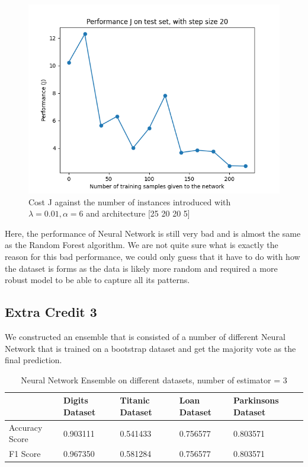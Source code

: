 \documentclass[letterpaper]{article}
\begin{document}
\begin{figure}[H]
	\includegraphics[width=\textwidth]{figures/nn_cleveland.csv_cost.png}
	\caption{Cost J against the number of instances introduced with $\lambda=0.01, \alpha=6$ and architecture [25 20 20 5]}
	\label{fig:nn-cleveland}
\end{figure}

Here, the performance of Neural Network is still very bad and is almost the same as the Random Forest algorithm. We are not quite sure what is exactly
the reason for this bad performance, we could only guess that it have to do with how the dataset is forms as the data is likely more random and required
a more robust model to be able to capture all its patterns.


\subsection*{Extra Credit 3}

We constructed an ensemble that is consisted of a number of different Neural Network that is trained on a bootstrap dataset and get the majority vote
as the final prediction.

\begin{table}[H]
	\centering
	\begin{tabular}{|l|l|l|l|l|}
		\hline
		               & Digits Dataset & Titanic Dataset & Loan Dataset & Parkinsons Dataset \\ \hline
		Accuracy Score & 0.903111       & 0.541433        & 0.756577     & 0.803571           \\ \hline
		F1 Score       & 0.967350       & 0.581284        & 0.756577     & 0.803571           \\ \hline
	\end{tabular}
	\caption{Neural Network Ensemble on different datasets, number of estimator = 3}
\end{table}
\end{document}
